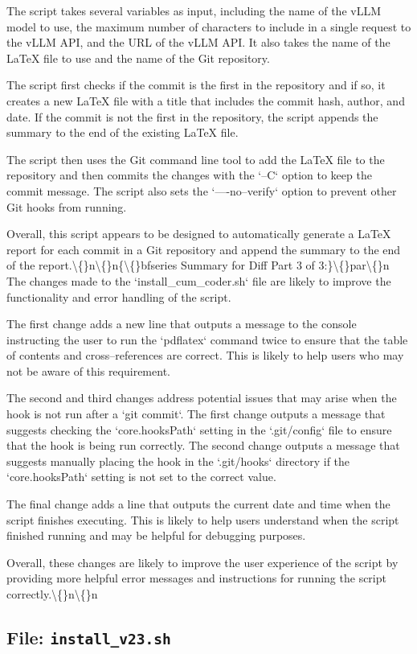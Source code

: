 \documentclass{article}
\begin{document}
{The script takes several variables as input, including the name of the vLLM model to use, the maximum number of characters to include in a single request to the vLLM API, and the URL of the vLLM API. It also takes the name of the LaTeX file to use and the name of the Git repository.

The script first checks if the commit is the first in the repository and if so, it creates a new LaTeX file with a title that includes the commit hash, author, and date. If the commit is not the first in the repository, the script appends the summary to the end of the existing LaTeX file.

The script then uses the Git command line tool to add the LaTeX file to the repository and then commits the changes with the `--C` option to keep the commit message. The script also sets the `----no--verify` option to prevent other Git hooks from running.

Overall, this script appears to be designed to automatically generate a LaTeX report for each commit in a Git repository and append the summary to the end of the report.\textbackslash\{\}n\textbackslash\{\}n\{\textbackslash\{\}bfseries Summary for Diff Part 3 of 3:\}\textbackslash\{\}par\textbackslash\{\}n  The changes made to the `install\_cum\_coder.sh` file are likely to improve the functionality and error handling of the script.

The first change adds a new line that outputs a message to the console instructing the user to run the `pdflatex` command twice to ensure that the table of contents and cross--references are correct. This is likely to help users who may not be aware of this requirement.

The second and third changes address potential issues that may arise when the hook is not run after a `git commit`. The first change outputs a message that suggests checking the `core.hooksPath` setting in the `.git/config` file to ensure that the hook is being run correctly. The second change outputs a message that suggests manually placing the hook in the `.git/hooks` directory if the `core.hooksPath` setting is not set to the correct value.

The final change adds a line that outputs the current date and time when the script finishes executing. This is likely to help users understand when the script finished running and may be helpful for debugging purposes.

Overall, these changes are likely to improve the user experience of the script by providing more helpful error messages and instructions for running the script correctly.\textbackslash\{\}n\textbackslash\{\}n\n}\n\n\subsection{File: \texttt{install\_v23.sh}}
\end{document}

